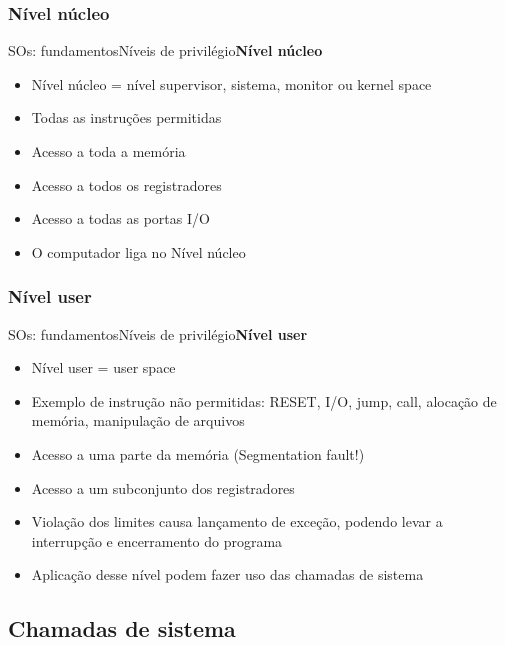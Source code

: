 \documentclass{beamer}
\begin{document}
      \subsubsection{Nível núcleo}
        \begin{frame}{SOs: fundamentos}{Níveis de privilégio}{\bfseries{Nível núcleo}}
          \begin{itemize}
            \item Nível núcleo = nível supervisor, sistema, monitor ou kernel space
            \item Todas as instruções permitidas
            \item Acesso a toda a memória
            \item Acesso a todos os registradores
            \item Acesso a todas as portas I/O
            \item O computador liga no Nível núcleo
          \end{itemize}  
        \end{frame}

      \subsubsection{Nível user}
        \begin{frame}{SOs: fundamentos}{Níveis de privilégio}{\bfseries{Nível user}}
          \begin{itemize}
            \item Nível user = user space
            \item Exemplo de instrução não permitidas: RESET, I/O, jump, call, alocação de memória, manipulação de arquivos
            \item Acesso a uma parte da memória (Segmentation fault!)
            \item Acesso a um subconjunto dos registradores
            \item Violação dos limites causa lançamento de exceção, podendo levar a interrupção e encerramento do programa
            \item Aplicação desse nível podem fazer uso das chamadas de sistema
          \end{itemize}  
        \end{frame}
  
    \subsection{Chamadas de sistema}
    
\end{document}
